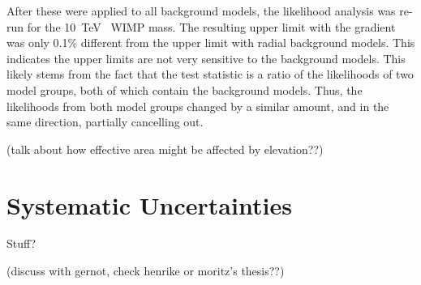   After these were applied to all background models, the likelihood analysis was re-run for the \SI{10}{\TeV{}} WIMP mass.
  The resulting upper limit with the gradient was only 0.1\% different from the upper limit with radial background models.
  This indicates the upper limits are not very sensitive to the background models.
  This likely stems from the fact that the test statistic is a ratio of the likelihoods of two model groups, both of which contain the background models.
  Thus, the likelihoods from both model groups changed by a similar amount, and in the same direction, partially cancelling out.
  
  {\color{red}(talk about how effective area might be affected by elevation??)}

\section{Systematic Uncertainties}  

Stuff?

{\color{red}(discuss with gernot, check henrike or moritz's thesis??)}


